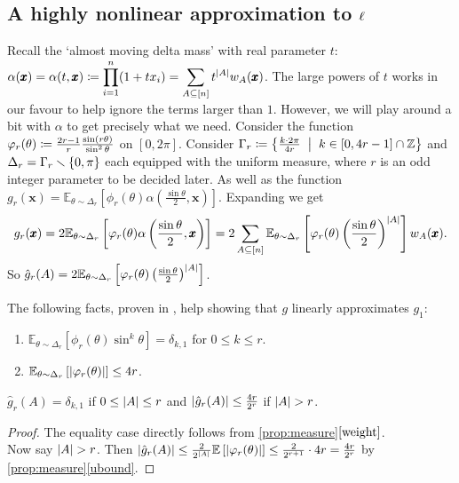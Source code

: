 \subsection*{A highly nonlinear approximation to $\ell$} Recall the `almost moving delta mass' with real parameter $t$: $\displaystyle\alpha(\pmb x) = \alpha(t,\pmb x) \coloneqq \prod_{i=1}^{n}(1+tx_{i}) = \sum_{A\subseteq [n]} t^{\left| A \right|}w_{A}(\pmb x)$. The large powers of $t$ works in our favour to help ignore the terms larger than $1$. However, we will play around a bit with $\alpha$ to get precisely what we need. Consider the function $\varphi_{r} (\theta) \coloneqq \frac{2r-1}{r} \frac{\sin(r\theta)}{\sin^{2}\theta}$ on $[0,2\pi]$. Consider $\Gamma_{r} \sett \set{\frac{k\cdot2\pi}{4r}\st k\in [0,4r-1]\cap \Z}$ and $\Delta_{r} = \Gamma_{r}\smallsetminus \left\{0,\pi\right\}$ each equipped with the uniform measure, where $r$ is an odd integer parameter to be decided later. As well as the function $g_{r}(\pmb x) = \mathbb E_{\theta\sim \Delta_{r}}\left[\phi_{r}(\theta)\alpha\left(\frac{\sin\theta}{2},\pmb x\right)\right]$. Expanding we get 
$$g_{r}(\pmb x) = 2\mathbb E_{\theta\sim \Delta_{r}}\left[\varphi_{r}(\theta)\alpha\left(\frac{\sin\theta}{2},\pmb x\right)\right] = 2\sum_{A\subseteq [n]}\mathbb E_{\theta\sim \Delta_{r}}\left[\varphi_{r}(\theta)\left(\frac{\sin\theta}{2}\right)^{\left| A \right|}\right] w_{A}(\pmb x).$$
So $\hat g_{r}(A) = 2\mathbb E_{\theta\sim \Delta_{r}}\left[\varphi_{r}(\theta)\left(\frac{\sin\theta}{2}\right)^{\left| A \right|}\right]$.

The following facts, proven in , help showing that $g$ linearly approximates $g_{1}$:
\begin{prop}\label{prop:measure}
\begin{enumerate}[label=(\alph*)] 
\item\label{weight} $\mathbb E_{\theta\sim \Delta_{r}}\left[\phi_{r}(\theta)\sin^{k}\theta\right] = \delta_{k,1}$ for $0\le k\le r$.
\item\label{ubound} $\mathbb E_{\theta\sim \Delta_{r}}\left[\left| \varphi_{r}(\theta) \right|\right] \le 4r$.
\end{enumerate}
\end{prop}

\begin{cor}\label{cor:small}
$\hat g_{r}(A) = \delta_{k,1}$ if $0\le \left| A \right|\le r$ and $\left| \hat g_{r}(A) \right|\le\frac{4r}{2^r}$ if $\left| A \right| > r$.
\end{cor}
\begin{proof}
The equality case directly follows from \cref{prop:measure}$\ref{weight}$.\\
Now say $\left| A \right| > r$. Then $\left| \hat g_{r}(A) \right| \le \frac{2}{2^{\left| A \right|}}\mathbb E\left[ \left| \varphi_{r}(\theta) \right| \right] \le \frac{2}{2^{r+1}}\cdot 4r = \frac{4r}{2^{r}}$ by \cref{prop:measure}\ref{ubound}.
\end{proof}

